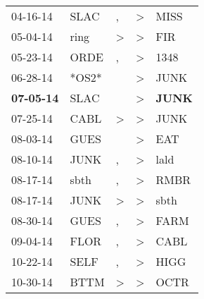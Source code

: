 \begin{supertabular}{p{0.07\textwidth}p{0.06\textwidth}p{0.02\textwidth}p{0.02\textwidth}p{0.06\textwidth}}
          04-16-14\textsuperscript{} &           SLAC\textsuperscript{} &                , &     \textgreater &           MISS\textsuperscript{} \\
          05-04-14\textsuperscript{} &           ring\textsuperscript{} &     \textgreater &     \textgreater &            FIR\textsuperscript{} \\
          05-23-14\textsuperscript{} &           ORDE\textsuperscript{} &                , &     \textgreater &           1348\textsuperscript{} \\
          06-28-14\textsuperscript{} &                            *OS2* &                  &     \textgreater &           JUNK\textsuperscript{} \\
 \textbf{07-05-14\textsuperscript{}} &           SLAC\textsuperscript{} &                  &     \textgreater &  \textbf{JUNK\textsuperscript{}} \\
          07-25-14\textsuperscript{} &           CABL\textsuperscript{} &     \textgreater &     \textgreater &           JUNK\textsuperscript{} \\
          08-03-14\textsuperscript{} &           GUES\textsuperscript{} &                  &     \textgreater &            EAT\textsuperscript{} \\
          08-10-14\textsuperscript{} &           JUNK\textsuperscript{} &                , &     \textgreater &           lald\textsuperscript{} \\
          08-17-14\textsuperscript{} &           sbth\textsuperscript{} &                , &     \textgreater &           RMBR\textsuperscript{} \\
          08-17-14\textsuperscript{} &           JUNK\textsuperscript{} &     \textgreater &     \textgreater &           sbth\textsuperscript{} \\
          08-30-14\textsuperscript{} &           GUES\textsuperscript{} &                , &     \textgreater &           FARM\textsuperscript{} \\
          09-04-14\textsuperscript{} &           FLOR\textsuperscript{} &                , &     \textgreater &           CABL\textsuperscript{} \\
          10-22-14\textsuperscript{} &           SELF\textsuperscript{} &                , &     \textgreater &           HIGG\textsuperscript{} \\
          10-30-14\textsuperscript{} &           BTTM\textsuperscript{} &     \textgreater &     \textgreater &           OCTR\textsuperscript{} \\

\end{supertabular}

